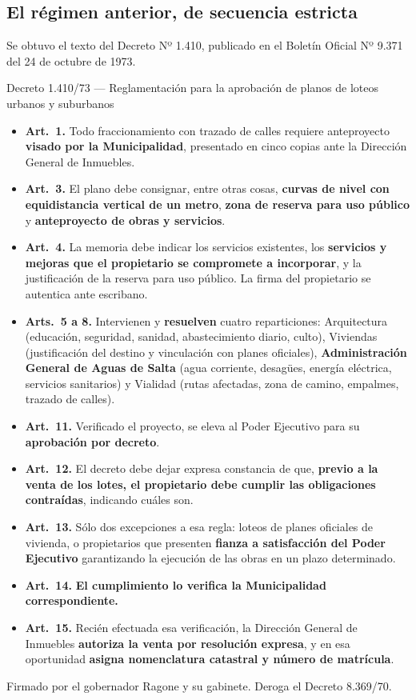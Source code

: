 \subsection*{El régimen anterior, de secuencia estricta}

Se obtuvo el texto del Decreto Nº 1.410, publicado en el Boletín Oficial Nº 9.371 del 24 de octubre de 1973.

\begin{ficha}{Decreto 1.410/73 --- Reglamentación para la aprobación de planos de loteos urbanos y suburbanos}
\begin{itemize}[leftmargin=*,nosep]
\item \textbf{Art.\ 1.} Todo fraccionamiento con trazado de calles requiere anteproyecto \textbf{visado por la Municipalidad}, presentado en cinco copias ante la Dirección General de Inmuebles.
\item \textbf{Art.\ 3.} El plano debe consignar, entre otras cosas, \textbf{curvas de nivel con equidistancia vertical de un metro}, \textbf{zona de reserva para uso público} y \textbf{anteproyecto de obras y servicios}.
\item \textbf{Art.\ 4.} La memoria debe indicar los servicios existentes, los \textbf{servicios y mejoras que el propietario se compromete a incorporar}, y la justificación de la reserva para uso público. La firma del propietario se autentica ante escribano.
\item \textbf{Arts.\ 5 a 8.} Intervienen y \textbf{resuelven} cuatro reparticiones: Arquitectura (educación, seguridad, sanidad, abastecimiento diario, culto), Viviendas (justificación del destino y vinculación con planes oficiales), \textbf{Administración General de Aguas de Salta} (agua corriente, desagües, energía eléctrica, servicios sanitarios) y Vialidad (rutas afectadas, zona de camino, empalmes, trazado de calles).
\item \textbf{Art.\ 11.} Verificado el proyecto, se eleva al Poder Ejecutivo para su \textbf{aprobación por decreto}.
\item \textbf{Art.\ 12.} El decreto debe dejar expresa constancia de que, \textbf{previo a la venta de los lotes, el propietario debe cumplir las obligaciones contraídas}, indicando cuáles son.
\item \textbf{Art.\ 13.} Sólo dos excepciones a esa regla: loteos de planes oficiales de vivienda, o propietarios que presenten \textbf{fianza a satisfacción del Poder Ejecutivo} garantizando la ejecución de las obras en un plazo determinado.
\item \textbf{Art.\ 14.} \textbf{El cumplimiento lo verifica la Municipalidad correspondiente.}
\item \textbf{Art.\ 15.} Recién efectuada esa verificación, la Dirección General de Inmuebles \textbf{autoriza la venta por resolución expresa}, y en esa oportunidad \textbf{asigna nomenclatura catastral y número de matrícula}.
\end{itemize}
Firmado por el gobernador Ragone y su gabinete. Deroga el Decreto 8.369/70.
\end{ficha}

